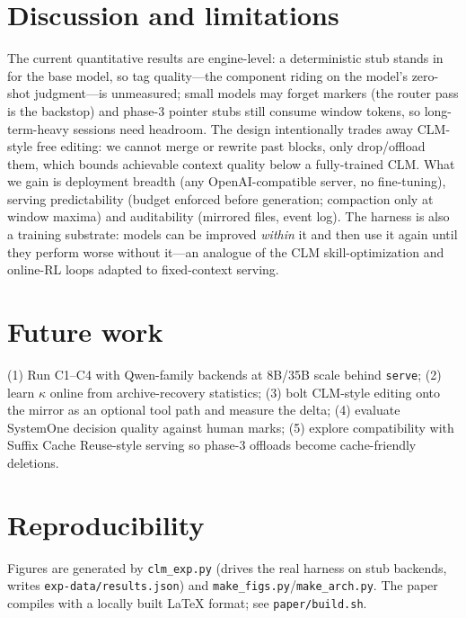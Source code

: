 \documentclass[10pt]{article}
\begin{document}
\section{Discussion and limitations}
The current quantitative results are engine-level: a deterministic stub stands in for the base model, so tag quality---the component riding on the model's zero-shot judgment---is unmeasured; small models may forget markers (the router pass is the backstop) and phase-3 pointer stubs still consume window tokens, so long-term-heavy sessions need headroom. The design intentionally trades away CLM-style free editing: we cannot merge or rewrite past blocks, only drop/offload them, which bounds achievable context quality below a fully-trained CLM. What we gain is deployment breadth (any OpenAI-compatible server, no fine-tuning), serving predictability (budget enforced before generation; compaction only at window maxima) and auditability (mirrored files, event log). The harness is also a training substrate: models can be improved \emph{within} it and then use it again until they perform worse without it---an analogue of the CLM skill-optimization and online-RL loops adapted to fixed-context serving.

\section{Future work}
(1) Run C1--C4 with Qwen-family backends at 8B/35B scale behind \texttt{serve}; (2) learn $\kappa$ online from archive-recovery statistics; (3) bolt CLM-style editing onto the mirror as an optional tool path and measure the delta; (4) evaluate SystemOne decision quality against human marks; (5) explore compatibility with Suffix Cache Reuse-style serving so phase-3 offloads become cache-friendly deletions.

\section*{Reproducibility}
Figures are generated by \texttt{clm\_exp.py} (drives the real harness on stub backends, writes \texttt{exp-data/results.json}) and \texttt{make\_figs.py}/\texttt{make\_arch.py}. The paper compiles with a locally built LaTeX format; see \texttt{paper/build.sh}.
\end{document}
